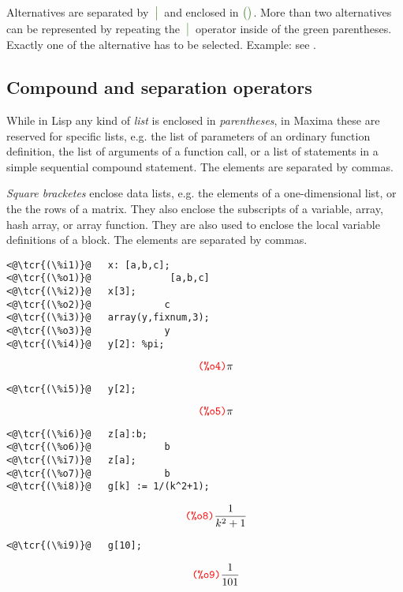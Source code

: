 \documentclass[../Maxima_Workbook.tex]{subfiles}
\begin{document}
\lz Alternatives are separated by $ \gbar $ and enclosed in $ \gpal \gpar $. More than two alternatives can be represented by repeating the $ \gbar $ operator inside of the green parentheses. Exactly one of the alternative has to be selected. Example: see .

\subsection{Compound and separation operators}

\lz \tcr{\emph{($ \dots , \dots , \dots $)}} \hfill {}\index{()}

\lz While in Lisp any kind of \emph{list} is enclosed in \emph{parentheses},  in Maxima these are reserved for specific lists, e.g. the list of parameters of an ordinary function definition, the list of arguments of a function call, or a list of statements in a simple sequential compound statement. The elements are separated by commas.

\lzz \tcr{\emph{[$ \dots , \dots , \dots $]}} \hfill {}\index{[]}

\lz \emph{Square bracketes} enclose data lists, e.g. the elements of a one-dimensional list, or the the rows of a matrix. They also enclose the subscripts of a variable, array, hash array, or array function. They are also used to enclose the local variable definitions of a block. The elements are separated by commas.

\lz \begin{small}
\color{blue} \leqn
\begin{lstlisting}
<@\tcr{(\%i1)}@   x: [a,b,c];
<@\tcr{(\%o1)}@			     [a,b,c]   
<@\tcr{(\%i2)}@   x[3];
<@\tcr{(\%o2)}@				c
<@\tcr{(\%i3)}@   array(y,fixnum,3);
<@\tcr{(\%o3)}@				y
<@\tcr{(\%i4)}@   y[2]: %pi;
\end{lstlisting}
\vspace{-5.5mm} \[ \tag*{\tcr{\ttfamily (\%o4)}} \pi \]
\vspace{-10.5mm} \begin{lstlisting}
<@\tcr{(\%i5)}@   y[2];
\end{lstlisting}
\vspace{-5.5mm} \[ \tag*{\tcr{\ttfamily (\%o5)}} \pi \]
\vspace{-10.5mm} \begin{lstlisting}
<@\tcr{(\%i6)}@   z[a]:b;
<@\tcr{(\%o6)}@				b	
<@\tcr{(\%i7)}@   z[a];
<@\tcr{(\%o7)}@				b
<@\tcr{(\%i8)}@   g[k] := 1/(k^2+1);
\end{lstlisting}
\vspace{-5mm} \[ \tag*{\tcr{\ttfamily (\%o8)}} \frac{1}{k^2+1} \]
\vspace{-8mm} \begin{lstlisting}
<@\tcr{(\%i9)}@   g[10];
\end{lstlisting}
\vspace{-5mm} \[ \tag*{\tcr{\ttfamily (\%o9)}} \frac{1}{101} \]
\color{black} \reqn
\end{small}
\end{document}
